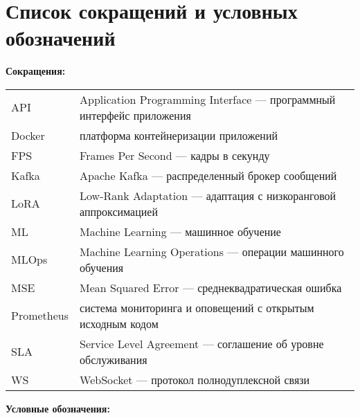 \newpage
\chapter*{Список сокращений и условных обозначений}  


\textbf{Сокращения:}

\begin{tabular}{p{} p{}}
API & Application Programming Interface --- программный интерфейс приложения \\
Docker & платформа контейнеризации приложений \\
FPS & Frames Per Second --- кадры в секунду \\
Kafka & Apache Kafka --- распределенный брокер сообщений \\
LoRA & Low-Rank Adaptation --- адаптация с низкоранговой аппроксимацией \\
ML & Machine Learning --- машинное обучение \\
MLOps & Machine Learning Operations --- операции машинного обучения \\
MSE & Mean Squared Error --- среднеквадратическая ошибка \\
Prometheus & система мониторинга и оповещений с открытым исходным кодом \\
SLA & Service Level Agreement --- соглашение об уровне обслуживания \\
WS & WebSocket --- протокол полнодуплексной связи \\
\end{tabular}

\vspace{1cm}

\textbf{Условные обозначения:}

